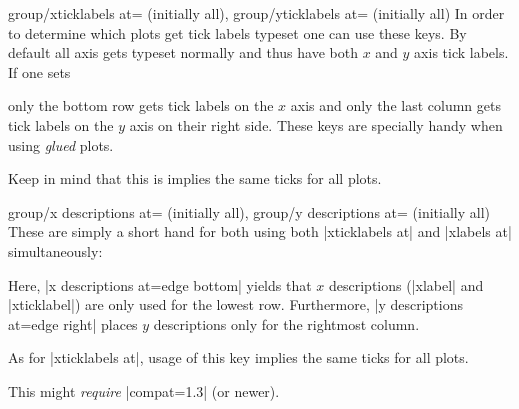 \begin{pgfplotskeylist}{%
	group/xticklabels at= (initially all),%
	group/yticklabels at= (initially all)}
  In order to determine which plots get tick labels typeset one can use these keys. By default all axis gets typeset normally and thus have both $x$ and
  $y$ axis tick labels. If one sets

\begin{codeexample}
\pgfplotsset{group/xticklabels at=edge bottom,group/yticklabels at=edge right}
\end{codeexample}
only the bottom row gets tick labels on the $x$ axis and only the last column gets tick labels on the $y$ axis on their right side. These keys are
specially handy when using \textit{glued} plots.

	Keep in mind that this is implies the same ticks for all plots.
\end{pgfplotskeylist}

\begin{pgfplotskeylist}{%
	group/x descriptions at= (initially all),%
	group/y descriptions at= (initially all)}
  These are simply a short hand for both using both |xticklabels at| and |xlabels at| simultaneously:

\begin{codeexample}[]
\end{codeexample}

Here, |x descriptions at=edge bottom| yields that $x$ descriptions (|xlabel| and |xticklabel|) are only used for the lowest row. Furthermore, |y descriptions at=edge right| places $y$ descriptions only for the rightmost column.

	As for |xticklabels at|, usage of this key implies the same ticks for all plots.

	This might \emph{require} |compat=1.3| (or newer).
\end{pgfplotskeylist}


